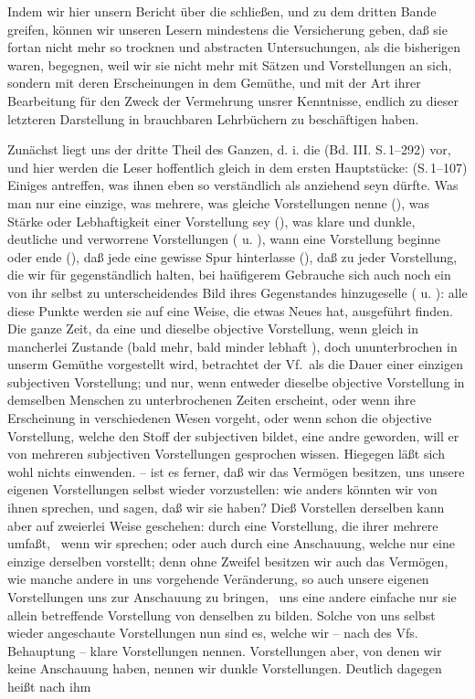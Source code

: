 Indem wir hier unsern Bericht über die  schließen, und zu dem dritten Bande greifen, können wir unseren Lesern mindestens die Versicherung geben, daß sie fortan nicht mehr so trocknen und abstracten Untersuchungen, als die bisherigen waren, begegnen, weil wir sie nicht mehr mit Sätzen und Vorstellungen an sich, sondern mit deren Erscheinungen in dem Gemüthe, und mit der Art ihrer Bearbeitung für den Zweck der Vermehrung unsrer Kenntnisse, endlich zu dieser letzteren Darstellung in brauchbaren Lehrbüchern zu beschäftigen haben. \par
Zunächst liegt uns der dritte Theil des Ganzen, d. i. die  (Bd. III. S.\,1--292) vor, und hier werden die Leser hoffentlich gleich in dem ersten Hauptstücke:  (S.\,1--107) Einiges antreffen, was ihnen eben so verständlich als anziehend seyn dürfte. Was man nur eine einzige, was mehrere, was gleiche Vorstellungen nenne (), was Stärke oder Lebhaftigkeit einer Vorstellung sey (), was klare und dunkle, deutliche und verworrene Vorstellungen ( u. ), wann eine Vorstellung beginne oder ende (), daß jede eine gewisse Spur hinterlasse (), daß zu jeder Vorstellung, die wir für gegenständlich halten, bei haüfigerem Gebrauche sich auch noch ein von ihr selbst zu unterscheidendes Bild ihres Gegenstandes hinzugeselle ( u. ): alle diese Punkte werden sie auf eine Weise, die etwas Neues hat, ausgeführt finden. Die ganze Zeit, da eine und dieselbe objective Vorstellung, wenn gleich in mancherlei Zustande (bald mehr, bald minder lebhaft \udgl ), doch ununterbrochen in unserm Gemüthe vorgestellt wird,  betrachtet der Vf.\ als die Dauer einer einzigen subjectiven Vorstellung; und nur, wenn entweder dieselbe objective Vorstellung in demselben Menschen zu unterbrochenen Zeiten erscheint, oder wenn ihre Erscheinung in verschiedenen Wesen vorgeht, oder wenn schon die objective Vorstellung, welche den Stoff der subjectiven bildet, eine andre geworden, will er von mehreren subjectiven Vorstellungen gesprochen wissen. Hiegegen läßt sich wohl nichts einwenden. --  ist es ferner, daß wir das Vermögen besitzen, uns unsere eigenen Vorstellungen selbst wieder vorzustellen: wie anders könnten wir von ihnen sprechen, und sagen, daß wir sie haben? Dieß Vorstellen derselben kann aber auf zweierlei Weise geschehen: durch eine Vorstellung, die ihrer mehrere umfaßt, \zB\ wenn wir  sprechen; oder auch durch eine Anschauung, welche nur eine einzige derselben vorstellt; denn ohne Zweifel besitzen wir auch das Vermögen, wie manche andere in uns vorgehende Veränderung, so auch unsere eigenen Vorstellungen uns zur Anschauung zu bringen, \dh\  uns eine andere einfache nur sie allein betreffende Vorstellung von denselben zu bilden. Solche von uns selbst wieder angeschaute Vorstellungen nun sind es, welche wir -- nach des Vfs. Behauptung -- klare Vorstellungen nennen. Vorstellungen aber, von denen wir keine Anschauung haben, nennen wir dunkle Vorstellungen. Deutlich dagegen heißt nach ihm 